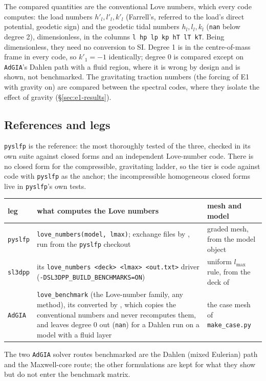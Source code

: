 \documentclass[11pt]{article}
\numberwithin{equation}{section}
\newcommand{\code}[1]{\texttt{#1}}
\begin{document}
The compared quantities are the conventional Love numbers, which every code
computes: the load numbers $h'_l,l'_l,k'_l$ (Farrell's, referred to the
load's direct potential, geodetic sign) and the geodetic tidal numbers
$h_l,l_l,k_l$ (\code{nan} below degree 2), dimensionless, in the columns
\code{l hp lp kp hT lT kT}. Being dimensionless, they need no conversion to
SI. Degree 1 is in the centre-of-mass frame in every code, so $k'_1=-1$
identically; degree 0 is compared except on \code{AdGIA}'s Dahlen path with
a fluid region, where it is wrong by design and is shown, not benchmarked.
The gravitating traction numbers (the forcing of E1 with gravity on) are
compared between the spectral codes, where they isolate the effect of
gravity (\S\ref{sec:e1-results}).

\subsection{References and legs}
\label{sec:e2-legs}

\code{pyslfp} is the reference: the most thoroughly tested of the three,
checked in its own suite against closed forms and an independent
Love-number code. There is no closed form for the compressible, gravitating
ladder, so the tier is code against code with \code{pyslfp} as the anchor;
the incompressible homogeneous closed forms live in \code{pyslfp}'s own
tests.
\begin{center}
\small
\begin{tabular}{@{}lP{8.6cm}P{5.0cm}@{}}
\toprule
leg & what computes the Love numbers & mesh and model \\
\midrule
\code{pyslfp} & \code{love\_numbers(model, lmax)}; exchange files by
, run from the
\code{pyslfp} checkout & graded mesh, from the model object \\ \addlinespace
\code{sl3dpp} & its \code{love\_numbers <deck> <lmax> <out.txt>} driver
(\code{-DSL3DPP\_BUILD\_BENCHMARKS=ON}) & uniform $l_{\max}$ rule, from the
deck of  \\ \addlinespace
\code{AdGIA} & \code{love\_benchmark} (the Love-number family, any method),
its  converted by
, which copies the
conventional numbers and never recomputes them, and leaves degree 0 out
(\code{nan}) for a Dahlen run on a model with a fluid layer & the case mesh
of \code{make\_case.py} \\
\bottomrule
\end{tabular}
\end{center}
\noindent The two \code{AdGIA} solver routes benchmarked are the Dahlen
(mixed Eulerian) path and the Maxwell-core route; the other formulations
are kept for what they show but do not enter the benchmark matrix.
\end{document}
